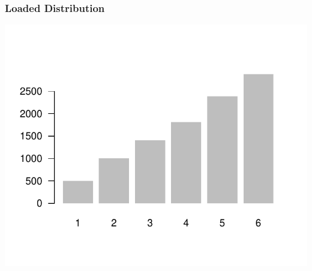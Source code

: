 \documentclass[12pt]{beamer}\usepackage[]{graphicx}\usepackage[]{color}
\newenvironment{knitrout}{}{} %
\begin{document}
\begin{frame}[fragile]
\frametitle{Loaded Distribution}

\begin{knitrout}\footnotesize
{}\color{fgcolor}

{\centering \includegraphics[width=.7\linewidth,height=.6\linewidth]{figure/unnamed-chunk-20-1} 

}



\end{knitrout}

\end{frame}


\begin{frame}
\begin{center}
\Huge{}
\end{center}
\end{frame}


\begin{frame}[fragile]
\frametitle{}
\begin{center}
\end{center}
\end{frame}

\end{document}
